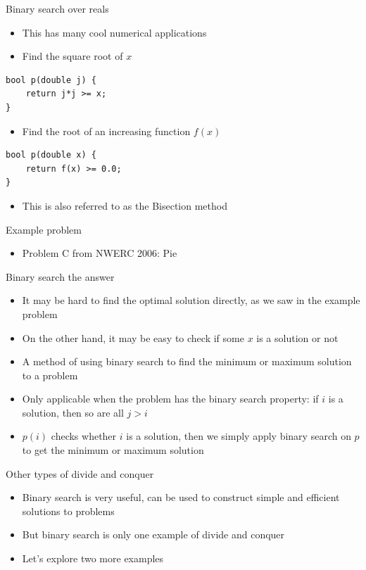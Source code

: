 \documentclass[10pt]{beamer}
\newcommand{\bi}{\begin{itemize}}
\newcommand{\ei}{\end{itemize}}
\begin{document}
\begin{frame}[fragile]{Binary search over reals}
    \bi
        \item This has many cool numerical applications
        \vspace{5pt}
        \item Find the square root of $x$
    \ei
    \begin{verbatim}
bool p(double j) {
    return j*j >= x;
}
    \end{verbatim}
    \bi
        \item Find the root of an increasing function $f(x)$
    \ei
    \begin{verbatim}
bool p(double x) {
    return f(x) >= 0.0;
}
    \end{verbatim}

    \bi
        \item This is also referred to as the Bisection method
    \ei
\end{frame}


\begin{frame}{Example problem}
    \bi
        \item Problem C from NWERC 2006: Pie
    \ei
\end{frame}

\begin{frame}{Binary search the answer}
    \bi
        \item It may be hard to find the optimal solution directly, as we saw in the example problem
        \item On the other hand, it may be easy to check if some $x$ is a solution or not
        \vspace{5pt}
        \item A method of using binary search to find the minimum or maximum solution to a problem
        \item Only applicable when the problem has the binary search property: if $i$ is a solution, then so are all $j > i$
        \vspace{5pt}
        \item $p(i)$ checks whether $i$ is a solution, then we simply apply binary search on $p$ to get the minimum or maximum solution
    \ei
\end{frame}


\begin{frame}{Other types of divide and conquer}
    \bi
        \item Binary search is very useful, can be used to construct simple and efficient solutions to problems
        \item But binary search is only one example of divide and conquer
        \item Let's explore two more examples
    \ei
\end{frame}
\end{document}
